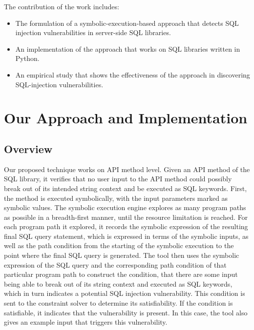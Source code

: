 \documentclass[conference]{IEEEtran}
\begin{document}
The contribution of the work includes:

\begin{itemize}

\item The formulation of a symbolic-execution-based approach that detects SQL injection vulnerabilities in server-side SQL libraries.

\item An implementation of the approach that works on SQL libraries written in Python.

\item An empirical study that shows the effectiveness of the approach in discovering SQL-injection vulnerabilities.

\end{itemize}

\section{Our Approach and Implementation}
\label{approach}

\subsection{Overview}

Our proposed technique works on API method level. Given an API method of the SQL library, it verifies that no user input to the API method could possibly break out of its intended string context and be executed as SQL keywords.
First, the method is executed symbolically, with the input parameters marked as symbolic values. The symbolic execution engine explores as many program paths as possible in a breadth-first manner, until the resource limitation is reached. For each program path it explored, it records the symbolic expression of the resulting final SQL query statement, which is expressed in terms of the symbolic inputs, as well as the path condition from the starting of the symbolic execution to the point where the final SQL query is generated. The tool then uses the symbolic expression of the SQL query and the corresponding path condition of that particular program path to construct the condition, that there are some input being able to break out of its string context and executed as SQL keywords, which in turn indicates a potential SQL injection vulnerability. This condition is sent to the constraint solver to determine its satisfiability. If the condition is satisfiable, it indicates that the vulnerability is present. In this case, the tool also gives an example input that triggers this vulnerability.
\end{document}

